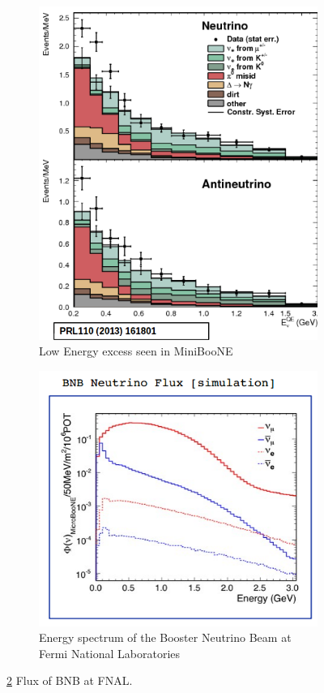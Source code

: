 \begin{figure}[htp!]
\centering
	\begin{subfigure}[b]{.4\textwidth}
	\includegraphics[width=\textwidth]{figs/lee.png}
	\caption{Low Energy excess seen in MiniBooNE}
	\label{fig:lee}
	\end{subfigure}
	\quad
	\begin{subfigure}[b]{.4\textwidth}
	\includegraphics[width=\textwidth]{figs/bnbflux.png}
	\caption{Energy spectrum of the Booster Neutrino Beam at Fermi National Laboratories}
	\label{fig:bnbflux}
	\end{subfigure}
	\quad
\label{fig:figures}
\caption{\ref{fig:bnbflux} Flux of BNB at FNAL.}
\end{figure}
